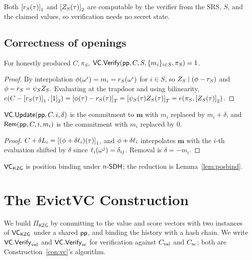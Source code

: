 Both $\left[r_S(\tau)\right]_{1}$ and $\left[Z_S(\tau)\right]_{2}$ are computable by the
verifier from the SRS, $S$, and the claimed values, so verification needs no
secret state.

\subsection{Correctness of openings}

\begin{lemma}\label{lem:open}
For honestly produced $C,\pi_S$, $\mathsf{VC}.\mathsf{Verify}(\mathsf{pp},C,S,\{m_i\}_{i\in S},\pi_S)=1$.
\end{lemma}
\begin{proof}
By interpolation $\phi(\omega^{i})=m_i=r_S(\omega^{i})$ for $i\in S$, so
$Z_S\mid(\phi-r_S)$ and $\phi-r_S=\psi_SZ_S$. Evaluating at the
trapdoor and using bilinearity,
$e(C-\left[r_S(\tau)\right]_{1},\left[1\right]_{2})=\left[\phi(\tau)-r_S(\tau)\right]_{T}
 =\left[\psi_S(\tau)Z_S(\tau)\right]_{T}=e(\pi_S,\left[Z_S(\tau)\right]_{2})$.
\end{proof}

\begin{lemma}\label{lem:update}
$\mathsf{VC}.\mathsf{Update}(\mathsf{pp},C,i,\delta)$ is the commitment to $\mathbf{m}$ with $m_i$
replaced by $m_i+\delta$, and $\mathsf{Rem}(\mathsf{pp},C,i,m_i)$ is the commitment with $m_i$
replaced by $0$.
\end{lemma}
\begin{proof}
$C+\delta L_i=\left[(\phi+\delta\ell_i)(\tau)\right]_{1}$, and $\phi+\delta\ell_i$
interpolates $\mathbf{m}$ with the $i$-th evaluation shifted by $\delta$ since
$\ell_i(\omega^{j})=\delta_{ij}$. Removal is $\delta=-m_i$.
\end{proof}

\begin{remark}\label{rem:vcbind}
$\mathsf{VC}_{\mathsf{KZG}}$ is position binding under $n\text{-}\mathsf{SDH}$; the reduction is
Lemma~\ref{lem:posbind}.
\end{remark}

\section{The EvictVC Construction}\label{sec:construction}

We build $\Pi_{\mathsf{KZG}}$ by committing to the value and score vectors with
two instances of $\mathsf{VC}_{\mathsf{KZG}}$ under a shared $\mathsf{pp}$, and binding the
history with a hash chain. We write $\mathsf{VC}.\mathsf{Verify}_{\mathrm{val}}$ and $\mathsf{VC}.\mathsf{Verify}_{\mathrm{sc}}$ for
verification against $C_{\mathrm{val}}$ and $C_{\mathrm{sc}}$; both are
Construction~\ref{con:vc}'s algorithm.

